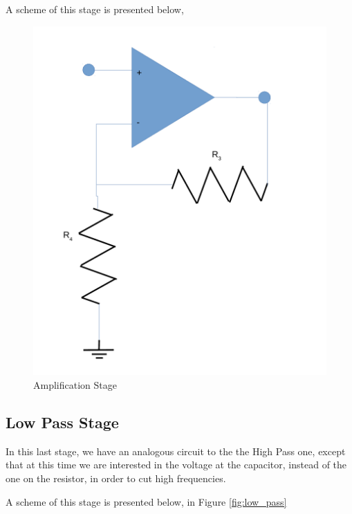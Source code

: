 A scheme of this stage is presented below, 

\begin{figure}[h]
    \centering
    \includegraphics[scale=0.3]{amp_l5_old.pdf}
    \caption{Amplification Stage}
    \label{fig:amp_old}
\end{figure}

\subsection{Low Pass Stage}

In this last stage, we have an analogous circuit to the the High Pass one, except that at this time we are interested in the voltage at the capacitor, instead of the one on the resistor, in order to cut high frequencies.

A scheme of this stage is presented below, in Figure \ref{fig:low_pass}

